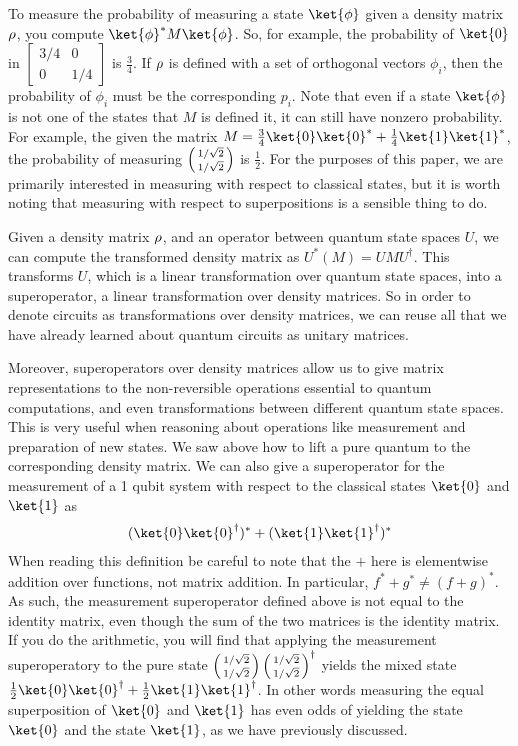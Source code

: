 To measure the probability of measuring a state $\ket{\phi}$ given a density matrix $\rho$, you compute $\ket{\phi}^*M\ket{\phi}$.
So, for example, the probability of $\ket{0}$ in $[\begin{smallmatrix} 3/4 & 0 \\ 0 & 1/4 \end{smallmatrix}]$ is $\frac{3}{4}$.
If $\rho$ is defined with a set of orthogonal vectors $\phi_i$, then the probability of $\phi_i$ must be the corresponding $p_i$.
Note that even if a state $\ket{\phi}$ is not one of the states that $M$ is defined it, it can still have nonzero probability.
For example, the given the matrix $M = \frac{3}{4}\ket{0}\ket{0}^* + \frac{1}{4}\ket{1}\ket{1}^*$, the probability of measuring $\left(\begin{smallmatrix}1 / \sqrt{2} \\ 1 / \sqrt{2}\end{smallmatrix}\right)$ is $\frac{1}{2}$.
For the purposes of this paper, we are primarily interested in measuring with respect to classical states, but it is worth noting that measuring with respect to superpositions is a sensible thing to do.

Given a density matrix $\rho$, and an operator between quantum state spaces $U$, we can compute the transformed density matrix as $U^*(M)=UMU^\dagger$.
This transforms $U$, which is a linear transformation over quantum state spaces, into a superoperator, a linear transformation over density matrices.
So in order to denote circuits as transformations over density matrices, we can reuse all that we have already learned about quantum circuits as unitary matrices.


Moreover, superoperators over density matrices allow us to give matrix representations to the non-reversible operations essential to quantum computations, and even transformations between different quantum state spaces.
This is very useful when reasoning about operations like measurement and preparation of new states.
We saw above how to lift a pure quantum to the corresponding density matrix.
We can also give a superoperator for the measurement of a 1 qubit system with respect to the classical states $\ket{0}$ and $\ket{1}$ as
\begin{align*}
    (\ket{0}\ket{0}^\dagger )^* + (\ket{1}\ket{1}^\dagger )^*
\end{align*}
When reading this definition be careful to note that the $+$ here is elementwise addition over functions, not matrix addition.
In particular, $f^* + g^* \neq (f+g)^*$.
As such, the measurement superoperator defined above is not equal to the identity matrix, even though the sum of the two matrices is the identity matrix.
If you do the arithmetic, you will find that applying the measurement superoperatory to the pure state $\left(\begin{smallmatrix}1/\sqrt{2} \\ 1/\sqrt{2}\end{smallmatrix}\right)\left(\begin{smallmatrix}1/\sqrt{2} \\ 1/\sqrt{2}\end{smallmatrix}\right)^\dagger$ yields the mixed state $\frac{1}{2}\ket{0}\ket{0}^\dagger + \frac{1}{2}\ket{1}\ket{1}^\dagger$.
In other words measuring the equal superposition of $\ket{0}$ and $\ket{1}$ has even odds of yielding the state $\ket{0}$ and the state $\ket{1}$, as we have previously discussed.

